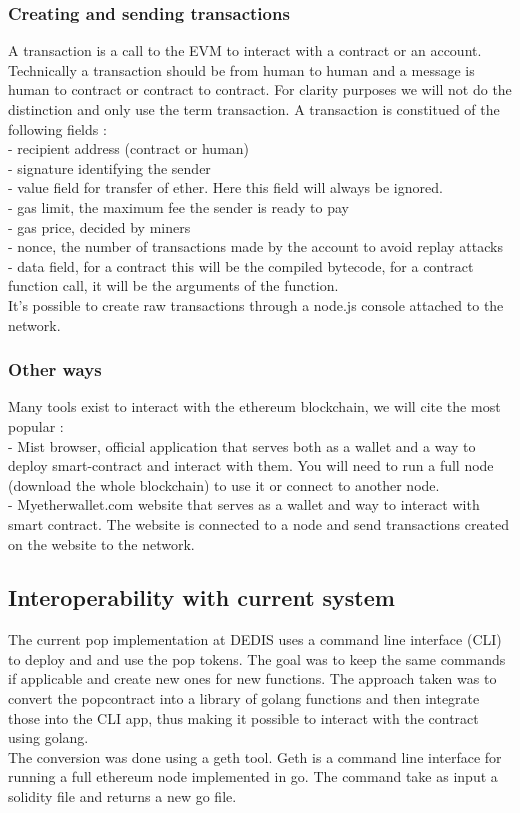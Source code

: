 \documentclass[11pt, a4paper, twoside, openright]{book} %
\begin{document}
\subsubsection{Creating and sending transactions}
A transaction is a call to the EVM to interact with a contract or an account. Technically a transaction should be from human to human and a message is human to contract or contract to contract. For clarity purposes we will not do the distinction and only use the term transaction. A transaction is constitued of the following fields : \\
- recipient address (contract or human) \\
- signature identifying the sender \\
- value field for transfer of ether. Here this field will always be ignored.\\
- gas limit, the maximum fee the sender is ready to pay \\
- gas price, decided by miners \\
- nonce, the number of transactions made by the account to avoid replay attacks\\
- data field, for a contract this will be the compiled bytecode, for a contract function call, it will be the arguments of the function. \\

It's possible to create raw transactions through a node.js console attached to the network.


\subsubsection{Other ways}
Many tools exist to interact with the ethereum blockchain, we will cite the most popular : \\
- Mist browser, official application that serves both as a wallet and a way to deploy smart-contract and interact with them. You will need to run a full node (download the whole blockchain) to use it or connect to another node.\\
- Myetherwallet.com website that serves as a wallet and way to interact with smart contract. The website is connected to a node and send transactions created on the website to the network.



\subsection{Interoperability with current system}
The current pop implementation at DEDIS uses a command line interface (CLI) to deploy and and use the pop tokens. The goal was to keep the same commands if applicable and create new ones for new functions. The approach taken was to convert the popcontract into a library of golang functions and then integrate those into the CLI app, thus making it possible to interact with the contract using golang.\\
The conversion was done using a geth tool. Geth is a command line interface for running a full ethereum node implemented in go. The command take as input a solidity file and returns a new go file. 
\end{document}
